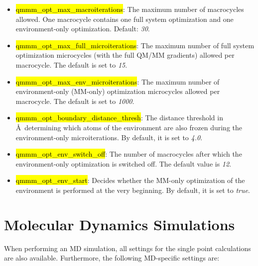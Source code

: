 \documentclass[]{tufte-book}
\begin{document}
{{\begin{itemize}
\item \hl{qmmm\_opt\_max\_macroiterations}: The maximum number of macrocycles allowed. One macrocycle contains one full system optimization and one environment-only optimization. Default: \textit{30}.
\item \hl{qmmm\_opt\_max\_full\_microiterations}: The maximum number of full system optimization microcycles (with the full QM/MM gradients) allowed per macrocycle. The default is set to \textit{15}.
\item \hl{qmmm\_opt\_max\_env\_microiterations}: The maximum number of environment-only (MM-only) optimization microcycles allowed per macrocycle. The default is set to \textit{1000}.
\item \hl{qmmm\_opt\_boundary\_distance\_thresh}: The distance threshold in \AA~determining which atoms of the environment are also frozen during the environment-only microiterations. By default, it is set to \textit{4.0}.
\item \hl{qmmm\_opt\_env\_switch\_off}: The number of macrocycles after which the environment-only optimization is switched off. The default value is \textit{12}.
\item \hl{qmmm\_opt\_env\_start}: Decides whether the MM-only optimization of the environment is performed at the very beginning. By default, it is set to \textit{true}.
\end{itemize}


\chapter{Molecular Dynamics Simulations}

When performing an MD simulation, all settings for the single point calculations are also available. Furthermore, the following MD-specific settings are:

}}
\end{document}

